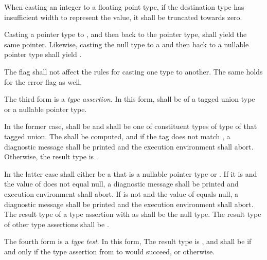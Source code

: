 \specsubsubitem
When casting an integer to a floating point type, if the destination type has
insufficient width to represent the value, it shall be truncated towards zero.

\specsubsubitem
Casting a pointer type to , and then back to the pointer
type, shall yield the same pointer. Likewise, casting the null type to a
 and then back to a nullable pointer type shall yield
.


\specsubsubitem
The  flag shall not affect the rules for casting one type to
another. The same holds for the error flag as well.

\specsubsubitem
The third form is a \textit{type assertion}. In this form,
 shall be of a tagged union type or a nullable
pointer type.

In the former case,  shall be 
and shall be one of constituent types of type of that tagged union. The
 shall be computed, and if the tag does not match
, a diagnostic message shall be printed and the execution
environment shall abort. Otherwise, the result type is .

In the latter case  shall either be a
 that is a nullable pointer type or . If it is
 and the value of  does not equal
null, a diagnostic message shall be printed and execution environment shall
abort. If  is not  and the value
of  equals null, a diagnostic message shall be
printed and the execution environment shall abort. The result type of a type
assertion with  as  shall be the
null type. The result type of other type assertions shall be .

\specsubsubitem The fourth form is a \textit{type test}. In this form, The
result type is , and shall be  if and only if the
type assertion from  to
 would succeed, or  otherwise.

